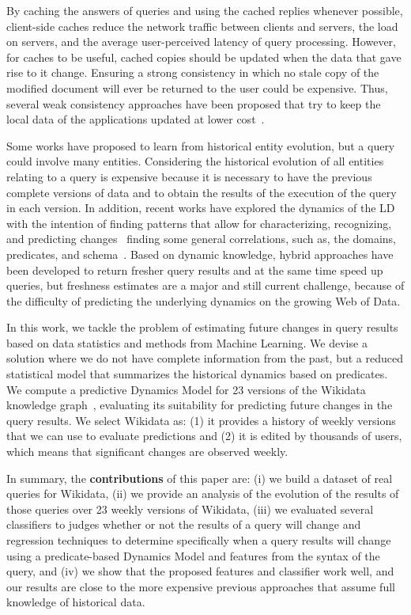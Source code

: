 \documentclass[runningheads]{llncs}
\begin{document}
By caching the answers of queries and using the cached replies whenever possible, client-side caches reduce the network traffic between clients and servers, the load on servers, and the average user-perceived latency of query processing. However, for caches to be useful, cached copies should be updated when the data that gave rise to it change.
Ensuring a strong consistency in which no stale copy of the modified document will ever be returned to the user could be expensive. Thus, several weak consistency approaches have been proposed that try to keep the local data of the applications updated at lower cost~\cite{KnuthHS16,DividinoGS15,NishiokaS17}.

Some works have proposed to learn from historical entity evolution, but a query could involve many entities. Considering the historical evolution of all entities relating to a query is expensive because it is necessary to have the previous complete versions of data and to obtain the results of the execution of the query in each version. In addition, recent works have explored the dynamics of the LD with the intention of finding patterns that allow for characterizing, recognizing, and predicting changes~\cite{KaferAUOH13,NishiokaS16,GonzalezH18} finding some general correlations, such as, the domains, predicates, and schema~\cite{KaferAUOH13,NishiokaS17,UmbrichHHPD10}. Based on dynamic knowledge, hybrid approaches have been developed to return fresher query results and at the same time speed up queries, but freshness estimates are a major and still current challenge, because of the difficulty of predicting the underlying dynamics on the growing Web of Data.

In this work, we tackle the problem of estimating future changes in query results based on data statistics and methods from Machine Learning. We devise a solution where we do not have complete information from the past, but a reduced statistical model that summarizes the historical dynamics based on predicates. We compute a predictive Dynamics Model for 23 versions of the Wikidata knowledge graph~\cite{VrandecicK14}, evaluating its suitability for predicting future changes in the query results. We select Wikidata as: (1) it provides a history of weekly versions that we can use to evaluate predictions and (2) it is edited by thousands of users, which means that significant changes are observed weekly.

In summary, the \textbf{contributions} of this paper are: (i) we build a dataset of real queries for Wikidata, (ii) we provide an analysis of the evolution of the results of those queries over 23 weekly versions of Wikidata, (iii) we evaluated several classifiers to judges whether or not the results of a query will change and regression techniques to determine specifically when a query results will change using a predicate-based Dynamics Model and features from the syntax of the query, and (iv) we show that the proposed features and classifier work well, and our results are close to the more expensive previous approaches that assume full knowledge of historical data.
\end{document}
